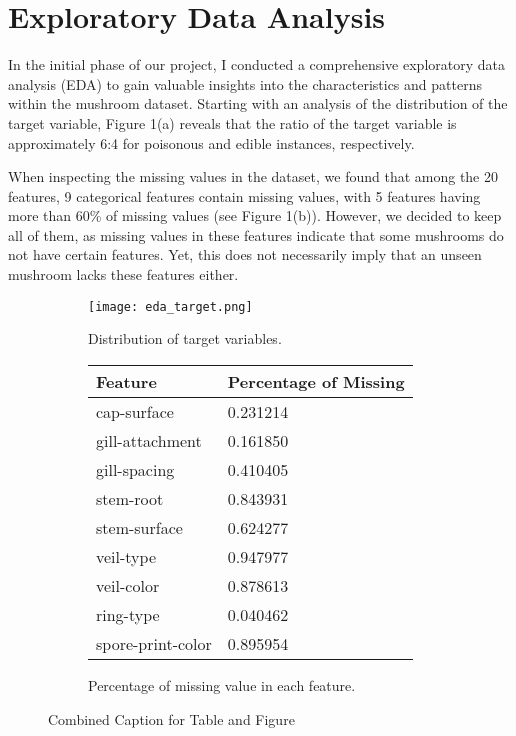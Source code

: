 \documentclass{article}
\begin{document}
\section{Exploratory Data Analysis}
\hspace{0.5cm} In the initial phase of our project, I conducted a comprehensive exploratory data analysis (EDA) to gain valuable insights into the characteristics and patterns within the mushroom dataset. Starting with an analysis of the distribution of the target variable, Figure 1(a) reveals that the ratio of the target variable is approximately 6:4 for poisonous and edible instances, respectively. 

When inspecting the missing values in the dataset, we found that among the 20 features, 9 categorical features contain missing values, with 5 features having more than 60\% of missing values (see Figure 1(b)). However, we decided to keep all of them, as missing values in these features indicate that some mushrooms do not have certain features. Yet, this does not necessarily imply that an unseen mushroom lacks these features either.

\begin{figure}[ht]
  \begin{subfigure}{0.5\textwidth}
    \centering
        \centering
        \texttt{[image: eda\_target.png]}
        \caption{\label{fig:target variable} Distribution of target variables.}
  \end{subfigure}%
  \hfill
  \begin{subfigure}{0.48\textwidth}

    \begin{tabular}{l|l}
        \textbf{Feature} & \textbf{Percentage of Missing} \\\hline
        cap-surface & 0.231214 \\\hline
        gill-attachment & 0.161850 \\\hline
        gill-spacing & 0.410405 \\\hline
        stem-root & 0.843931 \\\hline
        stem-surface & 0.624277 \\\hline
        veil-type & 0.947977 \\\hline
        veil-color & 0.878613 \\\hline
        ring-type & 0.040462 \\\hline
        spore-print-color & 0.895954 \\
    \end{tabular}
    \caption{\label{tab:widgets} Percentage of missing value in each feature.}
  \end{subfigure}
  \caption{Combined Caption for Table and Figure}
\end{figure}
\end{document}
